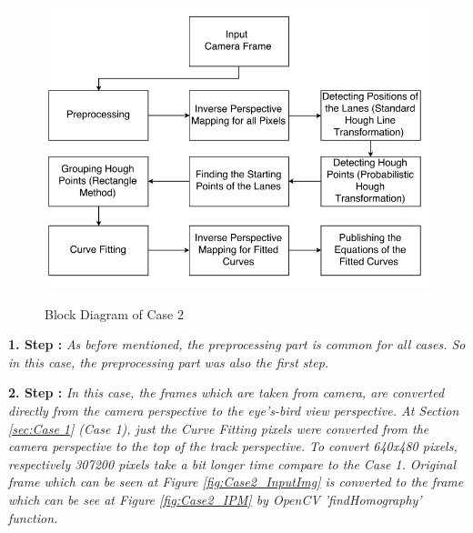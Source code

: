 \begin{figure}[H]
 \centering
  \includegraphics[width=1\textwidth]{./Bilder/Case2_BlockDiagram.png}\label{fig:Case2_BlockDiagram}
	\caption{Block Diagram of Case 2}
\end{figure}

\textbf{1. Step : }\emph{\color{blue}As before mentioned, the preprocessing part is common for all cases. So in this case, the preprocessing part was also the first step.}

\textbf{2. Step : }\emph{\color{blue}In this case, the frames which are taken from camera, are converted directly from the camera perspective to the eye's-bird view perspective. At Section \ref{sec:Case 1} (Case 1), just the Curve Fitting pixels were converted from the camera perspective to the top of the track perspective. To convert 640x480 pixels, respectively 307200 pixels take a bit longer time compare to the Case 1. Original frame which can be seen at Figure \ref{fig:Case2_InputImg} is converted to the frame which can be see at Figure \ref{fig:Case2_IPM} by OpenCV 'findHomography' function.}

